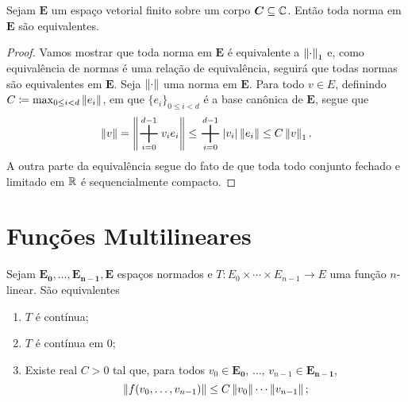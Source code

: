 \begin{prop}
Sejam $\bm E$ um espaço vetorial finito sobre um corpo $\bm C \subseteq \mathbb{C}$. Então toda norma em $\bm E$ são equivalentes.
\end{prop}
\begin{proof}
Vamos mostrar que toda norma em $\bm E$ é equivalente a $\left\Vert{\cdot}\right\Vert_1$ e, como equivalência de normas é uma relação de equivalência, seguirá que todas normas são equivalentes em $\bm E$. Seja $\left\Vert{\cdot}\right\Vert$ uma norma em $\bm E$. Para todo $v \in E$, definindo $C \coloneqq \max_{0\leq i <d} \left\Vert{e_i}\right\Vert$, em que $\{e_i\}_{0 \leq i < d}$ é a base canônica de $\bm E$, segue que
	\begin{equation*}
	\nor{v} = \nor{\bigplus_{i=0}^{d-1} v_ie_i} \leq \bigplus_{i=0}^{d-1}\abs{v_i}\nor{e_i} \leq C\nor{v}_1.
	\end{equation*}
A outra parte da equivalência segue do fato de que toda todo conjunto fechado e limitado em $\mathbb{R}$ é sequencialmente compacto.
\end{proof}

\section{Funções Multilineares}

\begin{prop}
Sejam $\bm{E_0},\dots,\bm{E_{n-1}},\bm{E}$ espaços normados e $T: E_0 \times \cdots \times E_{n-1} \to E$ uma função $n$-linear. São equivalentes
	\begin{enumerate}
	\item $T$ é contínua;
	\item $T$ é contínua em $0$;
	\item Existe real $C>0$ tal que, para todos $v_0 \in \bm{E_0}$, $\ldots$, $v_{n-1} \in \bm{E_{n-1}}$,
		\begin{equation*}
		\left\Vert{f(v_0,\dots,v_{n-1})}\right\Vert \leq C\left\Vert{v_0}\right\Vert\cdots\left\Vert{v_{n-1}}\right\Vert;
		\end{equation*}	
	\end{enumerate}
\end{prop}

